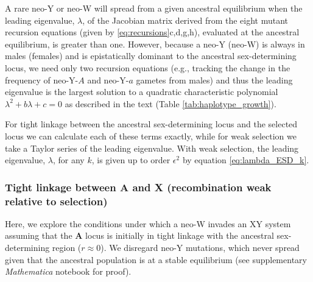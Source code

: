 \documentclass[12pt]{article}
\begin{document}
A rare neo-Y or neo-W will spread from a given ancestral equilibrium when the leading eigenvalue, $\lambda$, of the Jacobian matrix derived from the eight mutant recursion equations (given by \ref{eq:recursions}c,d,g,h), evaluated at the ancestral equilibrium, is greater than one.
However, because a neo-Y (neo-W) is always in males (females) and is epistatically dominant to the ancestral sex-determining locus, we need only two recursion equations (e.g., tracking the change in the frequency of neo-Y-$A$ and neo-Y-$a$ gametes from males) and thus the leading eigenvalue is the largest solution to a quadratic characteristic polynomial $\lambda^2 + b\lambda + c = 0$ as described in the text (Table \ref{tab:haplotype_growth}).

For tight linkage between the ancestral sex-determining locus and the selected locus we can calculate each of these terms exactly, while for weak selection we take a Taylor series of the leading eigenvalue. With weak selection, the leading eigenvalue, $\lambda$, for any $k$, is given up to order $\epsilon^2$ by equation \eqref{eq:lambda_ESD_k}.

\subsubsection*{Tight linkage between \textbf{A} and \textbf{X} (recombination weak relative to selection)}

Here, we explore the conditions under which a neo-W invades an XY system assuming that the \textbf{A} locus is initially in tight linkage with the ancestral sex-determining region ($r \approx 0$). 
We disregard neo-Y mutations, which never spread given that the ancestral population is at a stable equilibrium (see supplementary \textit{Mathematica} notebook for proof). 
\end{document}
